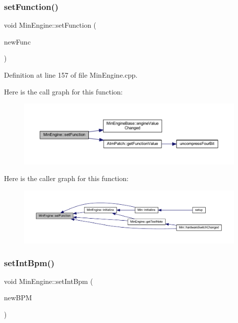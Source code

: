 \subsubsection{\texorpdfstring{set\+Function()}{setFunction()}}
{\footnotesize\ttfamily void Min\+Engine\+::set\+Function (\begin{DoxyParamCaption}\item[{\hyperlink{class_min_engine_a30e1f14df71447889a8a5060cff6fbd8}{Min\+Engine\+::\+Func}}]{new\+Func }\end{DoxyParamCaption})}



Definition at line 157 of file Min\+Engine.\+cpp.

Here is the call graph for this function\+:
\nopagebreak
\begin{figure}[H]
\begin{center}
\leavevmode
\includegraphics[width=350pt]{class_min_engine_a33949965a982b0d8e690ebc781e33977_cgraph}
\end{center}
\end{figure}
Here is the caller graph for this function\+:
\nopagebreak
\begin{figure}[H]
\begin{center}
\leavevmode
\includegraphics[width=350pt]{class_min_engine_a33949965a982b0d8e690ebc781e33977_icgraph}
\end{center}
\end{figure}
\mbox{\label{class_min_engine_a7ef07f3911096d861e030cccfd8899b5}} 
\subsubsection{\texorpdfstring{set\+Int\+Bpm()}{setIntBpm()}}
{\footnotesize\ttfamily void Min\+Engine\+::set\+Int\+Bpm (\begin{DoxyParamCaption}\item[{unsigned char}]{new\+B\+PM }\end{DoxyParamCaption})}



